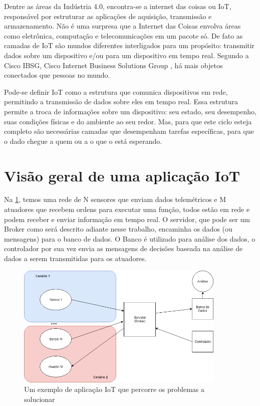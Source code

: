 Dentre as áreas da Indústria 4.0, encontra-se a internet das coisas ou IoT, responsável por estruturar as aplicações de aquisição, transmissão e armazenamento. Não é uma surpresa que a Internet das Coisas envolva áreas como eletrônica, computação e telecomunicações em um pacote só. De fato as camadas de IoT são mundos diferentes interligados para um propósito: transmitir dados sobre um dispositivo e/ou para um dispositivo em tempo real. Segundo a Cisco IBSG, Cisco Internet Business Solutions Group \cite{cisco:ibsg}, há mais objetos conectados que pessoas no mundo.

Pode-se definir IoT como a estrutura que comunica dispositivos em rede, permitindo a transmissão de dados sobre eles em tempo real. Essa estrutura permite a troca de informações sobre um dispositivo: seu estado, seu desempenho, suas condições físicas e do ambiente ao seu redor. Mas, para que este ciclo esteja completo são necessárias camadas que desempenham tarefas específicas, para que o dado chegue a quem ou a o que o está esperando.

\section{Visão geral de uma aplicação IoT}
\label{section:overview}

Na \ref{fig:1.1.0/iot_app}, temos uma rede de N sensores que enviam dados telemétricos e M atuadores que recebem ordens para executar uma função, todos estão em rede e podem receber e enviar informação em tempo real. O servidor, que pode ser um Broker como será descrito adiante nesse trabalho, encaminha os dados (ou mensagens) para o banco de dados. O Banco é utilizado para análise dos dados, o controlador por sua vez envia as mensagens de decisões baseada na análise de dados a serem transmitidas para os atuadores.

\begin{figure}[h!]
\centering
\includegraphics[width=10cm]{./02_Capitulos/02_Cap1/figures/iot_app}
\caption{Um exemplo de aplicação IoT que percorre os problemas a solucionar}
\label{fig:1.1.0/iot_app}
\end{figure}

